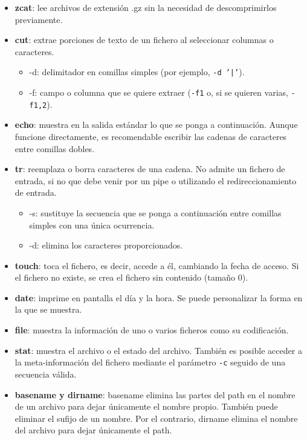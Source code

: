 \begin{itemize}
\item \textbf{zcat}: lee archivos de extensión .gz sin la necesidad de descomprimirlos previamente. 

\item \textbf{cut}: extrae porciones de texto de un fichero al seleccionar columnas o caracteres. \begin{itemize}
\item -d: delimitador en comillas simples (por ejemplo, \texttt{-d '|'}).
\item -f: campo o columna que se quiere extraer (\texttt{-f1} o, si se quieren varias, \texttt{-f1,2}).
\end{itemize}

\item \textbf{echo}: muestra en la salida estándar lo que se ponga a continuación. Aunque funcione directamente, es recomendable escribir las cadenas de caracteres entre comillas dobles.
 
\item \textbf{tr}: reemplaza o borra caracteres de una cadena. No admite un fichero de entrada, si no que debe venir por un pipe o utilizando el redireccionamiento de entrada. \begin{itemize}
\item -s: sustituye la secuencia que se ponga a continuación entre comillas simples con una única ocurrencia. 
\item -d: elimina los caracteres proporcionados.
\end{itemize}

\item \textbf{touch}: toca el fichero, es decir, accede a él, cambiando la fecha de acceso. Si el fichero no existe, se crea el fichero sin contenido (tamaño 0).

\item \textbf{date}: imprime en pantalla el día y la hora. Se puede personalizar la forma en la que se muestra. 

\item \textbf{file}: muestra la información de uno o varios ficheros como su codificación.

\item \textbf{stat}: muestra el archivo o el estado del archivo. También es posible acceder a la meta-información del fichero mediante el parámetro \texttt{-c} seguido de una secuencia válida. 

\item \textbf{basename y dirname}: basename elimina las partes del path en el nombre de un archivo para dejar únicamente el nombre propio. También puede eliminar el sufijo de un nombre. Por el contrario, dirname elimina el nombre del archivo para dejar únicamente el path.


\end{itemize}
